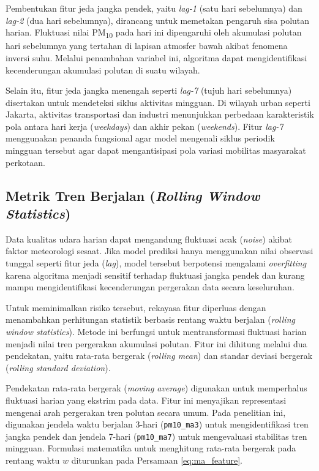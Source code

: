 Pembentukan fitur jeda jangka pendek, yaitu \textit{lag-1} (satu hari sebelumnya) dan \textit{lag-2} (dua hari sebelumnya), dirancang untuk memetakan pengaruh sisa polutan harian. Fluktuasi nilai PM\textsubscript{10} pada hari ini dipengaruhi oleh akumulasi polutan hari sebelumnya yang tertahan di lapisan atmosfer bawah akibat fenomena inversi suhu. Melalui penambahan variabel ini, algoritma dapat mengidentifikasi kecenderungan akumulasi polutan di suatu wilayah.

Selain itu, fitur jeda jangka menengah seperti \textit{lag-7} (tujuh hari sebelumnya) disertakan untuk mendeteksi siklus aktivitas mingguan. Di wilayah urban seperti Jakarta, aktivitas transportasi dan industri menunjukkan perbedaan karakteristik pola antara hari kerja (\textit{weekdays}) dan akhir pekan (\textit{weekends}). Fitur \textit{lag-7} menggunakan penanda fungsional agar model mengenali siklus periodik mingguan tersebut agar dapat mengantisipasi pola variasi mobilitas masyarakat perkotaan.

\subsection{Metrik Tren Berjalan (\textit{Rolling Window Statistics})}

Data kualitas udara harian dapat mengandung fluktuasi acak (\textit{noise}) akibat faktor meteorologi sesaat. Jika model prediksi hanya menggunakan nilai observasi tunggal seperti fitur jeda (\textit{lag}), model tersebut berpotensi mengalami \textit{overfitting} karena algoritma menjadi sensitif terhadap fluktuasi jangka pendek dan kurang mampu mengidentifikasi kecenderungan pergerakan data secara keseluruhan.

Untuk meminimalkan risiko tersebut, rekayasa fitur diperluas dengan menambahkan perhitungan statistik berbasis rentang waktu berjalan (\textit{rolling window statistics}). Metode ini berfungsi untuk mentransformasi fluktuasi harian menjadi nilai tren pergerakan akumulasi polutan. Fitur ini dihitung melalui dua pendekatan, yaitu rata-rata bergerak (\textit{rolling mean}) dan standar deviasi bergerak (\textit{rolling standard deviation}).

Pendekatan rata-rata bergerak (\textit{moving average}) digunakan untuk memperhalus fluktuasi harian yang ekstrim pada data. Fitur ini menyajikan representasi mengenai arah pergerakan tren polutan secara umum. Pada penelitian ini, digunakan jendela waktu berjalan 3-hari (\texttt{pm10\_ma3}) untuk mengidentifikasi tren jangka pendek dan jendela 7-hari (\texttt{pm10\_ma7}) untuk mengevaluasi stabilitas tren mingguan. Formulasi matematika untuk menghitung rata-rata bergerak pada rentang waktu $w$ diturunkan pada Persamaan \ref{eq:ma_feature}.

